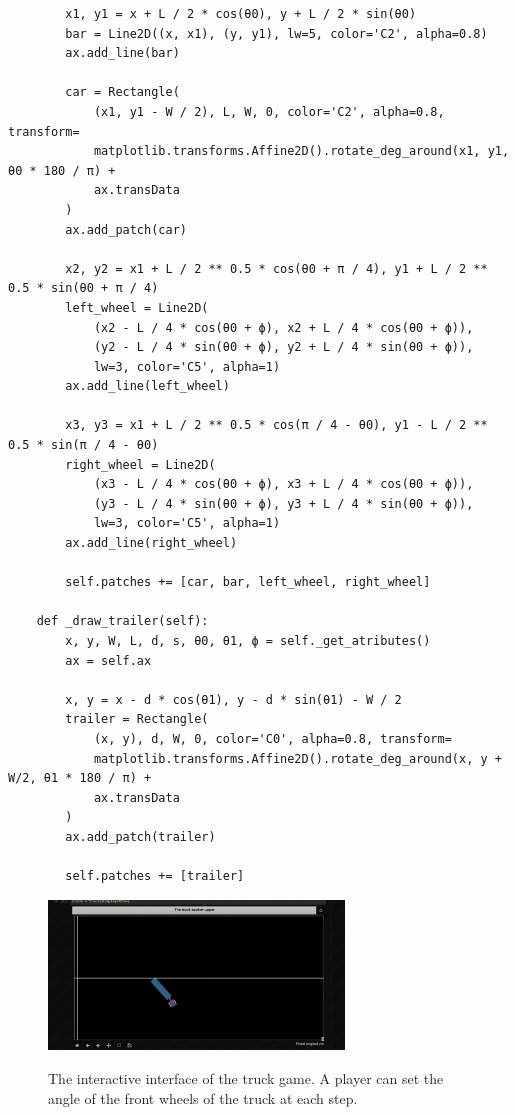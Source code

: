 \begin{verbatim}
        x1, y1 = x + L / 2 * cos(θ0), y + L / 2 * sin(θ0)
        bar = Line2D((x, x1), (y, y1), lw=5, color='C2', alpha=0.8)
        ax.add_line(bar)

        car = Rectangle(
            (x1, y1 - W / 2), L, W, 0, color='C2', alpha=0.8, transform=
            matplotlib.transforms.Affine2D().rotate_deg_around(x1, y1, θ0 * 180 / π) +
            ax.transData
        )
        ax.add_patch(car)

        x2, y2 = x1 + L / 2 ** 0.5 * cos(θ0 + π / 4), y1 + L / 2 ** 0.5 * sin(θ0 + π / 4)
        left_wheel = Line2D(
            (x2 - L / 4 * cos(θ0 + ϕ), x2 + L / 4 * cos(θ0 + ϕ)),
            (y2 - L / 4 * sin(θ0 + ϕ), y2 + L / 4 * sin(θ0 + ϕ)),
            lw=3, color='C5', alpha=1)
        ax.add_line(left_wheel)

        x3, y3 = x1 + L / 2 ** 0.5 * cos(π / 4 - θ0), y1 - L / 2 ** 0.5 * sin(π / 4 - θ0)
        right_wheel = Line2D(
            (x3 - L / 4 * cos(θ0 + ϕ), x3 + L / 4 * cos(θ0 + ϕ)),
            (y3 - L / 4 * sin(θ0 + ϕ), y3 + L / 4 * sin(θ0 + ϕ)),
            lw=3, color='C5', alpha=1)
        ax.add_line(right_wheel)
        
        self.patches += [car, bar, left_wheel, right_wheel]
        
    def _draw_trailer(self):
        x, y, W, L, d, s, θ0, θ1, ϕ = self._get_atributes()
        ax = self.ax
            
        x, y = x - d * cos(θ1), y - d * sin(θ1) - W / 2
        trailer = Rectangle(
            (x, y), d, W, 0, color='C0', alpha=0.8, transform=
            matplotlib.transforms.Affine2D().rotate_deg_around(x, y + W/2, θ1 * 180 / π) +
            ax.transData
        )
        ax.add_patch(trailer)
        
        self.patches += [trailer]
\end{verbatim}
\begin{figure}[H]
    \centering
    \includegraphics[width=0.7\textwidth]{labs/13/images/Screen Shot 2019-05-03 at 2.03.51 PM.png}
    \label{fig:state2}
    \caption{The interactive interface of the truck game. A player can set the angle of the front wheels
    of the truck at each step.}
\end{figure}
\\
